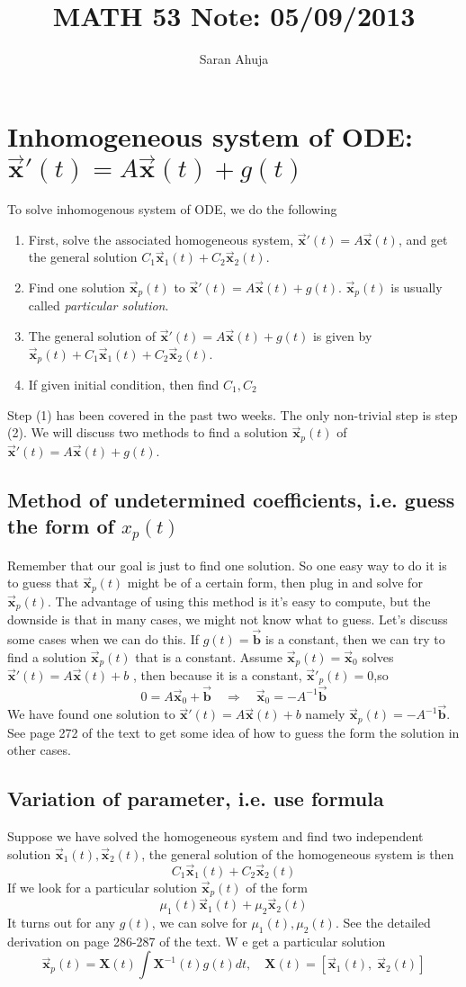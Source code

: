 \documentclass[10pt]{amsart}
\title{MATH 53 Note: 05/09/2013}
\author{Saran Ahuja}
\renewcommand{\l}{\left}
\renewcommand{\r}{\right}
\newcommand{\imply}{ \quad \Rightarrow \quad}
\newcommand{\x}{\vec{\mathbf{x}}}
\newcommand{\X}{\mathbf{X}}
\renewcommand{\b}{\vec{\mathbf{b}}}
\begin{document}
\maketitle

\section{Inhomogeneous system of ODE: $\x'(t) = A\x(t) + g(t)$}
To solve inhomogenous system of ODE, we do the following 
\begin{enumerate}
	\item First, solve the associated homogeneous system, $\x'(t) = A\x(t)$, and get the general solution $C_{1}\x_{1}(t)+C_{2}\x_{2}(t)$.
	\item Find one solution $\x_{p}(t)$ to $\x'(t) = A\x(t) + g(t)$. $\x_{p}(t)$ is usually called \textit{particular solution}.
	\item The general solution of  $\x'(t) = A\x(t) + g(t)$ is given by $\x_{p}(t)+C_{1}\x_{1}(t)+C_{2}\x_{2}(t)$.
	\item If given initial condition, then find $C_{1},C_{2}$
\end{enumerate}
Step (1) has been covered in the past two weeks. The only non-trivial step is step (2). We will discuss two methods to find a solution $\x_{p}(t)$ of $\x'(t) = A\x(t) + g(t)$. 

\subsection{Method of undetermined coefficients, i.e. guess the form of $x_{p}(t)$}
Remember that our goal is just to find one solution. So one easy way to do it is to guess that $\x_{p}(t)$ might be of a certain form, then plug in and solve for $\x_{p}(t)$. The advantage of using this method is it's easy to compute, but the downside is that in many cases, we might not know what to guess. Let's discuss some cases when we can do this. If $g(t) = \b $ is a constant, then we can try to find a solution $\x_{p}(t)$ that is a constant. Assume $\x_{p}(t) = \x_{0}$ solves $\x'(t) = A\x(t) + b$ , then because it is a constant, $\x'_{p}(t) = 0$,so
$$ 0 = A\x_{0}+\b  \imply \x_{0} = -A^{-1}\b $$
We have found one solution to $\x'(t) = A\x(t) + b$ namely $\x_{p}(t) = -A^{-1}\b$. See page 272 of the text to get some idea of how to guess the form the solution in other cases. 


\subsection{Variation of parameter, i.e. use formula}
Suppose we have solved the homogeneous system and find two independent solution $\x_{1}(t),\x_{2}(t)$, the general solution of the homogeneous system is then
$$ C_{1}\x_{1}(t)+C_{2}\x_{2}(t)$$
If we look for a particular solution $\x_{p}(t)$ of the form
$$ \mu_{1}(t) \x_{1}(t) + \mu_{2}\x_{2}(t) $$
It turns out for any $g(t)$, we can solve for $\mu_{1}(t),\mu_{2}(t)$. See the detailed derivation on page 286-287 of the text. W e get a particular solution 
$$ \x_{p}(t) = \X(t) \int \X^{-1}(t)g(t)dt,\quad \X(t) = \l[\x_{1}(t),\; \x_{2}(t) \r] $$
\end{document}
